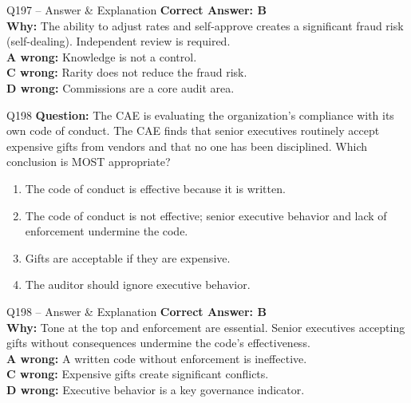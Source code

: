 \documentclass[aspectratio=169,10pt]{beamer}
\begin{document}
	\begin{frame}[t]{Q197 -- Answer \& Explanation}
		\small
		\textbf{Correct Answer: B} \\[4pt]
		\textbf{Why:} The ability to adjust rates and self-approve creates a significant fraud risk (self-dealing). Independent review is required. \\[4pt]
		\textbf{A wrong:} Knowledge is not a control. \\[2pt]
		\textbf{C wrong:} Rarity does not reduce the fraud risk. \\[2pt]
		\textbf{D wrong:} Commissions are a core audit area.
	\end{frame}
	
	\begin{frame}[t]{Q198}
		\small
		\textbf{Question:} The CAE is evaluating the organization's compliance with its own code of conduct. The CAE finds that senior executives routinely accept expensive gifts from vendors and that no one has been disciplined. Which conclusion is MOST appropriate?
		\begin{enumerate}[label=\Alph*.,itemsep=1pt,topsep=2pt]
			\item The code of conduct is effective because it is written.
			\item The code of conduct is not effective; senior executive behavior and lack of enforcement undermine the code.
			\item Gifts are acceptable if they are expensive.
			\item The auditor should ignore executive behavior.
		\end{enumerate}
	\end{frame}
	
	\begin{frame}[t]{Q198 -- Answer \& Explanation}
		\small
		\textbf{Correct Answer: B} \\[4pt]
		\textbf{Why:} Tone at the top and enforcement are essential. Senior executives accepting gifts without consequences undermine the code's effectiveness. \\[4pt]
		\textbf{A wrong:} A written code without enforcement is ineffective. \\[2pt]
		\textbf{C wrong:} Expensive gifts create significant conflicts. \\[2pt]
		\textbf{D wrong:} Executive behavior is a key governance indicator.
	\end{frame}
	
\end{document}
